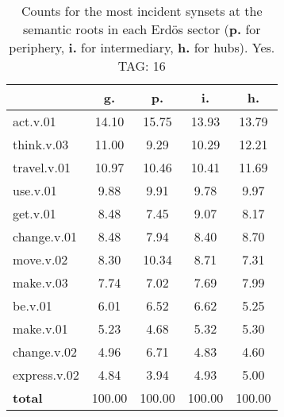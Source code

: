 \begin{table}[h!]
\begin{center}
\begin{tabular}{| l | c | c | c | c |}\hline
 & g. & p. & i. & h. \\\hline
act.v.01 & 14.10  & 15.75  & 13.93  & 13.79 \\\hline
think.v.03 & 11.00  & 9.29  & 10.29  & 12.21 \\\hline
travel.v.01 & 10.97  & 10.46  & 10.41  & 11.69 \\\hline
use.v.01 & 9.88  & 9.91  & 9.78  & 9.97 \\\hline
get.v.01 & 8.48  & 7.45  & 9.07  & 8.17 \\\hline
change.v.01 & 8.48  & 7.94  & 8.40  & 8.70 \\\hline
move.v.02 & 8.30  & 10.34  & 8.71  & 7.31 \\\hline
make.v.03 & 7.74  & 7.02  & 7.69  & 7.99 \\\hline
be.v.01 & 6.01  & 6.52  & 6.62  & 5.25 \\\hline
make.v.01 & 5.23  & 4.68  & 5.32  & 5.30 \\\hline
change.v.02 & 4.96  & 6.71  & 4.83  & 4.60 \\\hline
express.v.02 & 4.84  & 3.94  & 4.93  & 5.00 \\\hline
{{\bf total}} & 100.00  & 100.00  & 100.00  & 100.00 \\\hline
\end{tabular}
\caption{Counts for the most incident synsets at the semantic roots in each Erd\"os sector ({\bf p.} for periphery, {\bf i.} for intermediary, {\bf h.} for hubs). Yes. TAG: 16}
\end{center}
\end{table}